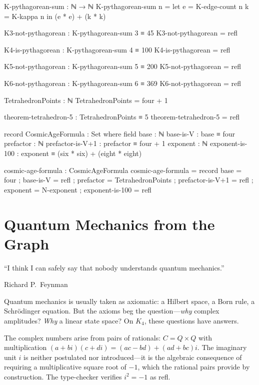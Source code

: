 \documentclass[11pt,a4paper]{book}
\def\mathbb#1{#1}%
\def\texttt#1{#1}%
\begin{document}
\begin{code}
K-pythagorean-sum : ℕ → ℕ
K-pythagorean-sum n = let e = K-edge-count n
                          k = K-kappa n
                      in (e * e) + (k * k)

K3-not-pythagorean : K-pythagorean-sum 3 ≡ 45
K3-not-pythagorean = refl

K4-is-pythagorean : K-pythagorean-sum 4 ≡ 100
K4-is-pythagorean = refl

K5-not-pythagorean : K-pythagorean-sum 5 ≡ 200
K5-not-pythagorean = refl

K6-not-pythagorean : K-pythagorean-sum 6 ≡ 369
K6-not-pythagorean = refl

TetrahedronPoints : ℕ
TetrahedronPoints = four + 1

theorem-tetrahedron-5 : TetrahedronPoints ≡ 5
theorem-tetrahedron-5 = refl

record CosmicAgeFormula : Set where
  field
    base : ℕ
    base-is-V : base ≡ four
    prefactor : ℕ
    prefactor-is-V+1 : prefactor ≡ four + 1
    exponent : ℕ
    exponent-is-100 : exponent ≡ (six * six) + (eight * eight)

cosmic-age-formula : CosmicAgeFormula
cosmic-age-formula = record
  { base = four ; base-is-V = refl
  ; prefactor = TetrahedronPoints ; prefactor-is-V+1 = refl
  ; exponent = N-exponent ; exponent-is-100 = refl }
\end{code}

\chapter{Quantum Mechanics from the Graph}
\label{ch:qm-from-graph}

\epigraph{``I think I can safely say that nobody understands quantum mechanics.''}{Richard P.~Feynman}

Quantum mechanics is usually taken as axiomatic: a Hilbert space, a Born rule, a Schr\"odinger equation. But the axioms beg the question---\emph{why} complex amplitudes? \emph{Why} a linear state space? On $K_4$, these questions have answers.

The complex numbers arise from pairs of rationals: $\mathbb{C} = \mathbb{Q} \times \mathbb{Q}$ with multiplication $(a + bi)(c + di) = (ac - bd) + (ad + bc)i$. The imaginary unit $i$ is neither postulated nor introduced---it is the algebraic consequence of requiring a multiplicative square root of $-1$, which the rational pairs provide by construction. The type-checker verifies $i^2 = -1$ as \texttt{refl}.
\end{document}
